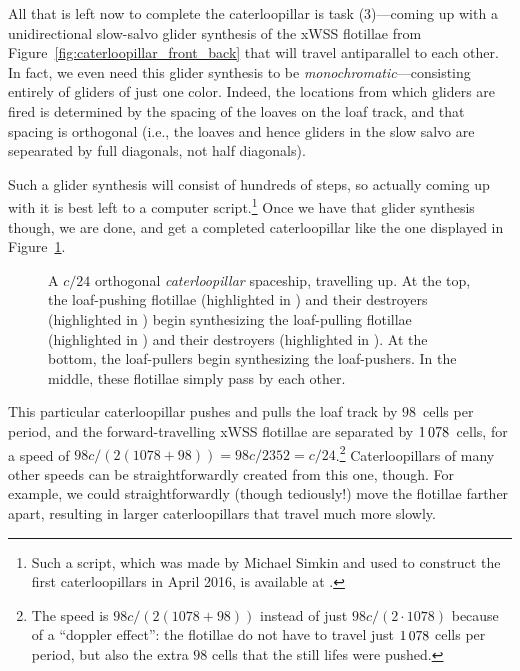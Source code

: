 All that is left now to complete the caterloopillar is task (3)---coming up with a unidirectional slow-salvo glider synthesis of the xWSS flotillae from Figure~\ref{fig:caterloopillar_front_back} that will travel antiparallel to each other. In fact, we even need this glider synthesis to be \emph{monochromatic}---consisting entirely of gliders of just one color. Indeed, the locations from which gliders are fired is determined by the spacing of the loaves on the loaf track, and that spacing is orthogonal (i.e., the loaves and hence gliders in the slow salvo are sepearated by full diagonals, not half diagonals).

Such a glider synthesis will consist of hundreds of steps, so actually coming up with it is best left to a computer script.\footnote{Such a script, which was made by Michael Simkin and used to construct the first caterloopillars in April 2016, is available at .} Once we have that glider synthesis though, we are done, and get a completed caterloopillar like the one displayed in Figure~\ref{fig:caterloopillar}.

\begin{figure}[!htbp]
	\centering
	\caption{A $c/24$ orthogonal \emph{caterloopillar} spaceship, travelling up. At the top, the loaf-pushing flotillae (highlighted in ) and their destroyers (highlighted in ) begin synthesizing the loaf-pulling flotillae (highlighted in ) and their destroyers (highlighted in ). At the bottom, the loaf-pullers begin synthesizing the loaf-pushers. In the middle, these flotillae simply pass by each other.}\label{fig:caterloopillar}
\end{figure}

This particular caterloopillar pushes and pulls the loaf track by $98$~cells per period, and the forward-travelling xWSS flotillae are separated by $1{\,}078$~cells, for a speed of $98c/(2(1078 + 98)) = 98c/2352 = c/24$.\footnote{The speed is $98c/(2(1078 + 98))$ instead of just $98c/(2 \cdot 1078)$ because of a ``doppler effect'': the flotillae do not have to travel just $1{\,}078$ cells per period, but also the extra $98$ cells that the still lifes were pushed.} Caterloopillars of many other speeds can be straightforwardly created from this one, though. For example, we could straightforwardly (though tediously!) move the flotillae farther apart, resulting in larger caterloopillars that travel much more slowly.

